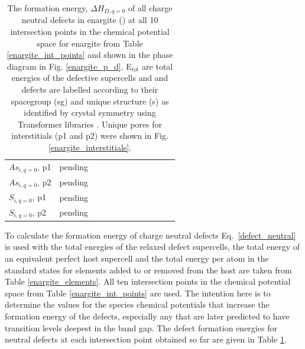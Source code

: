 \documentclass[11pt, twoside]{report}
\begin{document}
\begin{table}[]
\begin{tabular}{@{}llllllllllll@{}}
$As_{i, q=0}$, p1    & pending                         &        &        &        &        &        &        &        &        &        &        \\
$As_{i, q=0}$, p2    & pending                         &        &        &        &        &        &        &        &        &        &        \\
$S_{i, q=0}$, p1     & pending                         &        &        &        &        &        &        &        &        &        &        \\
$S_{i, q=0}$, p2     & pending                         &        &        &        &        &        &        &        &        &        &        \\ \bottomrule
\end{tabular}
\caption[The formation energy, $\Delta H_{D, q = 0}$ of all charge neutral defects in enargite ({\enargite}) at all 10 intersection points in the chemical potential space for enargite from Table \ref{enargite_int_points} and shown in the phase diagram in Fig. \ref{enargite_p_d}. E$_{tot}$ are total energies of the defective supercells and defects are labelled according to their spacegroup (sg) and unique structure (s) as identified by crystal symmetry using Transformer libraries. Unique pores for interstitials were shown in Fig. \ref{enargite_interstitials}.]{The formation energy, $\Delta H_{D, q = 0}$ of all charge neutral defects in enargite ({\enargite}) at all 10 intersection points in the chemical potential space for enargite from Table \ref{enargite_int_points} and shown in the phase diagram in Fig. \ref{enargite_p_d}. E$_{tot}$ are total energies of the defective supercells and and defects are labelled according to their spacegroup (sg) and unique structure (s) as identified by crystal symmetry using Transformer libraries \cite{Transformer}. Unique pores for interstitials (p1 and p2) were shown in Fig. \ref{enargite_interstitials}.}\label{enargite_neutral_Ef}
\end{table}

To calculate the formation energy of charge neutral defects Eq.~\ref{defect_neutral} is used with the total energies of the relaxed defect supercells, the total energy of an equivalent perfect host supercell and the total energy per atom in the standard states for elements added to or removed from the host are taken from Table \ref{enargite_elements}. All ten intersection points in the chemical potential space from Table \ref{enargite_int_points} are used. The intention here is to determine the values for the species chemical potentials that increase the formation energy of the defects, especially any that are later predicted to have transition levels deepest in the band gap. The defect formation energies for neutral defects at each intersection point obtained so far are given in Table \ref{enargite_neutral_Ef}.
\end{document}
